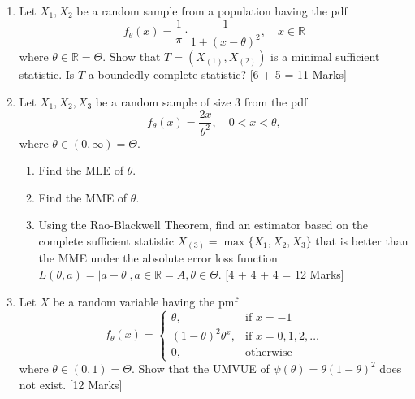 \documentclass[11pt]{article}
\begin{document}
\begin{enumerate}
    \item Let $X_{1}, X_{2}$ be a random sample from a population having the pdf
    \[ f_{\theta}(x)=\frac{1}{\pi} \cdot \frac{1}{1+(x-\theta)^{2}}, \quad x \in \mathbb{R} \]
    where $\theta \in \mathbb{R} = \Theta$. Show that $\underline{T}=(X_{(1)},X_{(2)})$ is a minimal sufficient statistic. Is $T$ a boundedly complete statistic? \hfill [6 + 5 = 11 Marks]

    \item Let $X_{1}, X_{2}, X_{3}$ be a random sample of size 3 from the pdf
    \[ f_{\theta}(x)=\frac{2x}{\theta^{2}}, \quad 0 < x < \theta, \]
    where $\theta \in (0, \infty) = \Theta$.
    \begin{enumerate}
        \item[(i)] Find the MLE of $\theta$.
        \item[(ii)] Find the MME of $\theta$.
        \item[(iii)] Using the Rao-Blackwell Theorem, find an estimator based on the complete sufficient statistic $X_{(3)}=\max\{X_{1},X_{2},X_{3}\}$ that is better than the MME under the absolute error loss function $L(\theta,a)=|a-\theta|, a \in \mathbb{R} = A, \theta \in \Theta$. \hfill [4 + 4 + 4 = 12 Marks]
    \end{enumerate}

    \item Let $X$ be a random variable having the pmf
    \[ f_{\theta}(x) = 
    \begin{cases} 
    \theta, & \text{if } x = -1 \\
    (1-\theta)^{2}\theta^{x}, & \text{if } x = 0, 1, 2, \dots \\
    0, & \text{otherwise}
    \end{cases} \]
    where $\theta \in (0,1) = \Theta$. Show that the UMVUE of $\psi(\theta)=\theta(1-\theta)^{2}$ does not exist. \hfill [12 Marks]

\end{enumerate}
\end{document}
